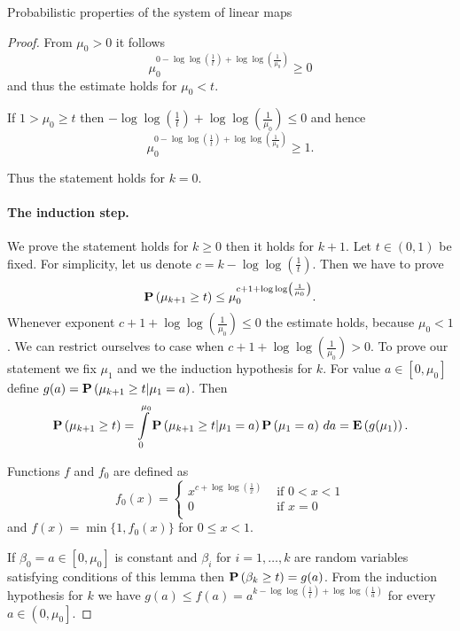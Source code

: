 \begin{section}{Probabilistic properties of the system of linear maps}
\begin{proof}
From $\mu_0 > 0$ it follows
\[
	\mu_0^{0 - \log \log \left(\frac{1}{t}\right) + \log \log \left(\frac{1}{\mu_0}\right)} \geq 0
\]
and thus the estimate holds for $\mu_0 < t$.

If $1 > \mu_0 \geq t$ then $-\log \log \left(\frac{1}{t}\right) + \log \log \left(\frac{1}{\mu_0}\right) \leq 0$ and hence
\[
	\mu_0^{0 - \log \log \left(\frac{1}{t}\right) + \log \log \left(\frac{1}{\mu_0}\right)} \geq 1 \text{.}
\]

Thus the statement holds for $k = 0$.

\paragraph*{The induction step.} We prove the statement holds for $k \geq 0$ then it holds for $k + 1$. Let $t \in (0, 1)$ be fixed. For simplicity, let us denote $c = k - \log \log \left(\frac{1}{t}\right)$. Then we have to prove
\[
	\mathbf{P}\left(\mu_{k + 1} \geq t\right) \leq \mu_0 ^ {c + 1 + \log \log \left(\frac{1}{\mu_0}\right)} \text{.}
\]
Whenever exponent $c + 1 + \log \log \left(\frac{1}{\mu_0}\right) \leq 0$ the estimate holds, because $\mu_0 < 1$. We can restrict ourselves to case when $c + 1 + \log \log \left(\frac{1}{\mu_0}\right) > 0$. To prove our statement we fix $\mu_1$ and we the induction hypothesis for $k$. For value $a \in \left[0, \mu_0\right]$ define $g(a) = \mathbf{P}\left(\mu_{k + 1} \geq t | \mu_1 = a\right)$. Then
\[
	\mathbf{P}\left(\mu_{k + 1} \geq t\right) = \int\limits_{0}^{\mu_0}\mathbf{P}\left(\mu_{k + 1} \geq t | \mu_1 = a\right)\mathbf{P}\left(\mu_1 = a\right) \, da = \mathbf{E}\left(g(\mu_1)\right) \text{.}
\]

Functions $f$ and $f_0$ are defined as
\[ 
	f_0(x) = \begin{cases}
		x ^ {c + \log \log \left(\frac{1}{x}\right)} & \text{ if } 0 < x < 1 \\ 
		0 & \text{ if } x = 0 \\
	\end{cases}
\]
and $f(x) = \min \{1, f_0(x) \}$ for $0 \leq x < 1$.

If $\beta_0 = a \in \left[0, \mu_0 \right]$ is constant and $\beta_i$ for $i = 1, \dots, k$ are random variables satisfying conditions of this lemma then $\mathbf{P}\left(\beta_k \geq t\right) = g(a)$. From the induction hypothesis for $k$ we have $g(a) \leq f(a) = a^{k - \log \log \left(\frac{1}{t}\right) + \log \log \left(\frac{1}{a}\right)}$ for every $a \in \left(0, \mu_0 \right]$.


\end{proof}
\end{section}

